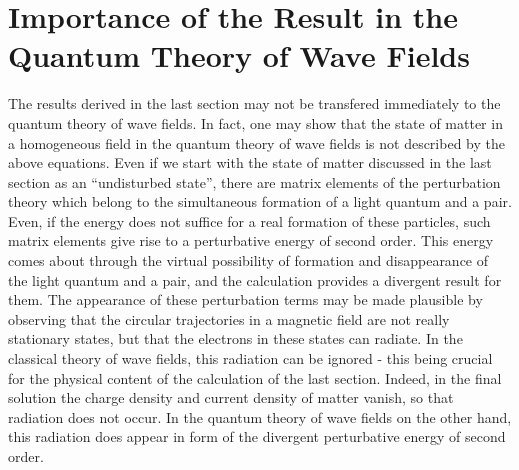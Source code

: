 \documentclass{article}
\begin{document}
\section{Importance of the Result in the Quantum Theory of Wave Fields}
The results derived in the last section may not be transfered immediately to the quantum theory of wave fields.
In fact, one may show that the state of matter in a homogeneous field in the quantum theory of wave fields is not
described by the above equations.
Even if we start with the state of matter discussed in the last section as an ``undisturbed state'', there are
matrix elements of the perturbation theory which belong to the simultaneous formation of a light quantum and a pair.
Even, if the energy does not suffice for a real formation of these particles, such matrix elements give rise to a
perturbative energy of second order. This energy comes about through the virtual
possibility of formation and disappearance of the light quantum and a pair, and the calculation provides a
divergent result for them. The appearance of these perturbation terms may be made plausible by observing that
the circular trajectories in a magnetic field are not really stationary states, but that the electrons in these
states can radiate. In the classical theory of wave fields, this radiation can be ignored - this being crucial
for the physical content of the calculation of the last section. Indeed, in the final solution the charge density
and current density of matter vanish, so that radiation does not occur. In the quantum theory of wave fields
on the other hand, this radiation does appear in form of the divergent perturbative energy of second order.
\end{document}
